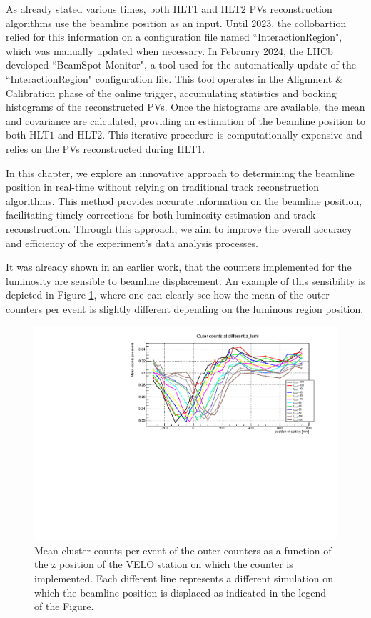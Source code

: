 As already stated various times, both HLT$1$ and HLT$2$ PVs reconstruction algorithms use the beamline position as an input. Until 2023, the collobartion relied for this information on a configuration file named ``InteractionRegion", which was manually updated when necessary. In February 2024, the LHCb developed ``BeamSpot Monitor", a tool used for the automatically update of the ``InteractionRegion" configuration file.  This tool operates in the Alignment \& Calibration phase of the online trigger, accumulating statistics and booking histograms of the reconstructed PVs. Once the histograms are available, the mean and covariance are calculated, providing an estimation of the beamline position to both HLT$1$ and HLT$2$. This iterative procedure is computationally expensive and relies on the PVs reconstructed during HLT$1$.

In this chapter, we explore an innovative approach to determining the beamline position in real-time without relying on traditional track reconstruction algorithms. This method provides accurate information on the beamline position, facilitating timely corrections for both luminosity estimation and track reconstruction. Through this approach, we aim to improve the overall accuracy and efficiency of the experiment's data analysis processes.

It was already shown in an earlier work\cite{dan}, that the counters implemented for the luminosity are sensible to beamline displacement. An example of this sensibility is depicted in Figure \ref{fig:z_lumi_dependency}, where one can clearly see how the mean of the outer counters per event is slightly different depending on the luminous region position. 

\begin{figure}
    \centering
    \includegraphics[width=\textwidth]{figures/z_lumi_dependency.pdf}
    \caption{Mean cluster counts per event of the outer counters as a function of the z position of the VELO station on which the counter is implemented. Each different line represents a different simulation on which the beamline position is displaced as indicated in the legend of the Figure.}
    \label{fig:z_lumi_dependency}
\end{figure}

